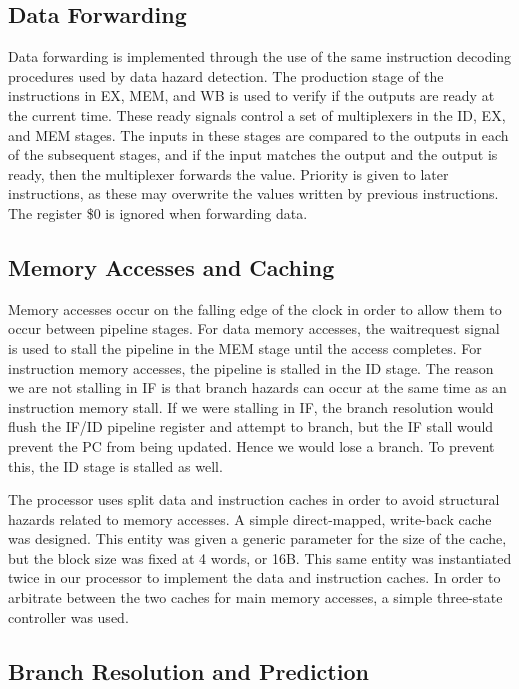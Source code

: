 \documentclass[conference,hidelinks]{IEEEtran}
\begin{document}
\subsection{Data Forwarding}

Data forwarding is implemented through the use of the same instruction decoding procedures used by data hazard detection. The production stage of the instructions in EX, MEM, and WB is used to verify if the outputs are ready at the current time. These ready signals control a set of multiplexers in the ID, EX, and MEM stages. The inputs in these stages are compared to the outputs in each of the subsequent stages, and if the input matches the output and the output is ready, then the multiplexer forwards the value. Priority is given to later instructions, as these may overwrite the values written by previous instructions. The register \$0 is ignored when forwarding data.

\subsection{Memory Accesses and Caching}

Memory accesses occur on the falling edge of the clock in order to allow them to occur between pipeline stages. For data memory accesses, the waitrequest signal is used to stall the pipeline in the MEM stage until the access completes. For instruction memory accesses, the pipeline is stalled in the ID stage. The reason we are not stalling in IF is that branch hazards can occur at the same time as an instruction memory stall. If we were stalling in IF, the branch resolution would flush the IF/ID pipeline register and attempt to branch, but the IF stall would prevent the PC from being updated. Hence we would lose a branch. To prevent this, the ID stage is stalled as well.

The processor uses split data and instruction caches in order to avoid structural hazards related to memory accesses. A simple direct-mapped, write-back cache was designed. This entity was given a generic parameter for the size of the cache, but the block size was fixed at 4 words, or 16B. This same entity was instantiated twice in our processor to implement the data and instruction caches. In order to arbitrate between the two caches for main memory accesses, a simple three-state controller was used.

\subsection{Branch Resolution and Prediction}
\end{document}
